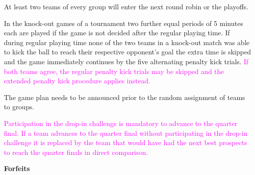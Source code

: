 \bigskip

At least two teams of every group will enter the next round robin or the playoffs.

\bigskip

In the knock-out games of a tournament two further equal periods of 5 minutes each are played if the game is not decided after the regular playing time.  If during regular playing time none of the two teams in a knock-out match was able to kick the ball to reach their respective opponent's goal the extra time is skipped and the game immediately continues by the five alternating penalty kick trials. \textcolor{magenta}{If both teams agree, the regular penalty kick trials may be skipped and the extended penalty kick procedure applies instead.}

\bigskip


The game plan needs to be announced prior to the random assignment of teams to groups.


\bigskip

\textcolor{magenta}{Participation in the drop-in challenge is mandatory to advance to the quarter final. If a team advances to the quarter final without participating in the drop-in challenge it is replaced by the team that would have had the next best prospects to reach the quarter finals in direct comparison.}

\bigskip

{\bfseries Forfeits}

